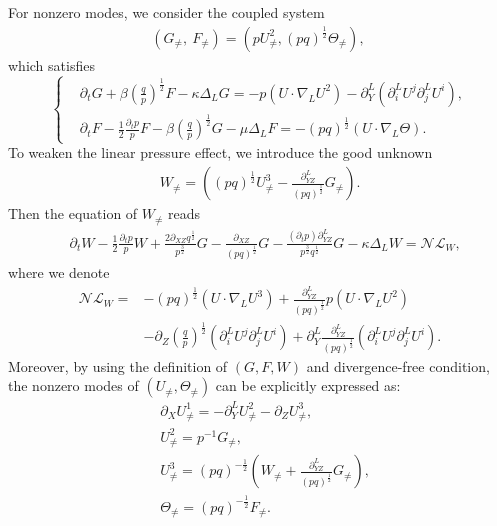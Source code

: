 \documentclass[12pt]{article}
\numberwithin{equation}{section}
\begin{document}
	For nonzero modes, we consider the coupled system
	\begin{align}
		(G_{\neq},\ F_{\neq})=(pU^2_{\neq},(pq)^{\frac{1}{2}}\Theta_{\neq}),\ 
	\end{align}
	which satisfies
	\begin{equation}
		\left\{\begin{aligned}
			&\partial_t G+\beta\left(\frac{q }{p}\right)^{\frac{1}{2}}F-\kappa \Delta_L G=-p(U\cdot\nabla_LU^2)-\partial_Y^L(\partial_i^LU^j\partial_j^LU^i),\\
			&\partial_t F-\frac{1}{2}\frac{\partial_t p}{p}F-\beta\left(\frac{q }{p}\right)^{\frac{1}{2}}G -\mu \Delta_L F=-(pq)^{\frac{1}{2}}(U\cdot\nabla_L\Theta).
		\end{aligned}\right.
	\end{equation}
    To weaken the linear pressure effect, we introduce the good unknown
    \begin{align}
        W_{\neq}=\left((pq)^{\frac{
				1}{2}}U^3_{\neq}-\frac{\partial_{YZ}^L}{(pq)^{\frac{1}{2}}}G_{\neq}\right).\label{def-w}
    \end{align}
    Then the equation of $W_{\neq}$ reads
    \begin{align}
        &\partial_t W-\frac{1}{2}\frac{\partial_t p}{p}W+\frac{2\partial_{XZ}q^{\frac{1}{2}}}{p^{\frac{3}{2}}}G -\frac{\partial_{XZ}}{(pq)^{\frac{1}{2}}}G-\frac{(\partial_tp)\partial_{YZ}^L}{p^{\frac{3}{2}}q^{\frac{1}{2}}}G -\kappa\Delta_LW=\mathcal{NL}_{W},
    \end{align}
	where we denote
	\begin{equation}\label{eq-w}
		\begin{aligned}
			\mathcal{NL}_{W}=&-(pq)^{\frac{1}{2}}(U\cdot\nabla_LU^3)+\frac{\partial_{YZ}^L}{(pq)^{\frac{1}{2}}}p(U\cdot\nabla_LU^2)\\
			&-\partial_Z(\frac{q}{p})^{\frac{1}{2}}(\partial_i^LU^j\partial_j^LU^i)+\partial_Y^L\frac{\partial_{YZ}^L}{(pq)^{\frac{1}{2}}}(\partial_i^LU^j\partial_j^LU^i).
		\end{aligned}
	\end{equation}
	Moreover, by using the definition of $(G,F,W)$ and divergence-free condition, the nonzero modes of $(U_{\neq},\Theta_{\neq})$ can be explicitly expressed as:
	\begin{align*}
		&\partial_XU^1_{\neq}=-\partial_Y^LU^2_{\neq}-\partial_ZU^3_{\neq},\\
		&U^2_{\neq}=p^{-1}G_{\neq},\\
		&U^3_{\neq}=(pq)^{-\frac{1}{2}}\left(W_{\neq}+\frac{\partial_{YZ}^L}{(pq)^{\frac{1}{2}}}G_{\neq}\right),\\
		&\Theta_{\neq}=(pq)^{-\frac{1}{2}}F_{\neq}.
 	\end{align*}
\end{document}
